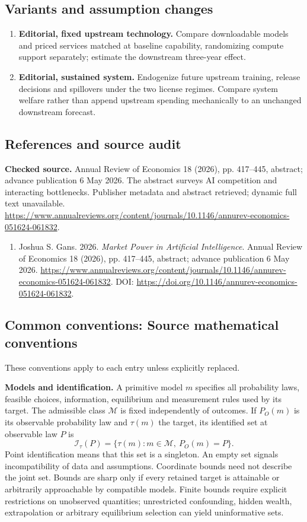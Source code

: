 \documentclass[11pt,a4paper]{article}
\begin{document}
\subsection*{Variants and assumption changes}
\begin{enumerate}
\item \textbf{Editorial, fixed upstream technology.} Compare downloadable models and priced services matched at baseline capability, randomizing compute support separately; estimate the downstream three-year effect.
\item \textbf{Editorial, sustained system.} Endogenize future upstream training, release decisions and spillovers under the two license regimes. Compare system welfare rather than append upstream spending mechanically to an unchanged downstream forecast.
\end{enumerate}
\subsection*{References and source audit}
\textbf{Checked source.} Annual Review of Economics 18 (2026), pp. 417--445, abstract; advance publication 6 May 2026. The abstract surveys AI competition and interacting bottlenecks. Publisher metadata and abstract retrieved; dynamic full text unavailable. \url{https://www.annualreviews.org/content/journals/10.1146/annurev-economics-051624-061832}.
\begin{enumerate}\raggedright
\item\hypertarget{definitions:source:30007699:1}{} Joshua S. Gans. 2026. \emph{Market Power in Artificial Intelligence}. Annual Review of Economics 18 (2026), pp. 417--445, abstract; advance publication 6 May 2026.
\url{https://www.annualreviews.org/content/journals/10.1146/annurev-economics-051624-061832}.
DOI: \url{https://doi.org/10.1146/annurev-economics-051624-061832}.
\end{enumerate}

\subsection*{Common conventions: Source mathematical conventions}

These conventions apply to each entry unless explicitly replaced.

\textbf{Models and identification.} A primitive model \(m\) specifies all probability laws, feasible choices, information, equilibrium and measurement rules used by its target. The admissible class \(\mathcal M\) is fixed independently of outcomes. If \(P_O(m)\) is its observable probability law and \(\tau(m)\) the target, its identified set at observable law \(P\) is
\[
 \mathcal I_\tau(P)=\{\tau(m):m\in\mathcal M,\ P_O(m)=P\}.
\]
Point identification means that this set is a singleton. An empty set signals incompatibility of data and assumptions. Coordinate bounds need not describe the joint set. Bounds are sharp only if every retained target is attainable or arbitrarily approachable by compatible models. Finite bounds require explicit restrictions on unobserved quantities; unrestricted confounding, hidden wealth, extrapolation or arbitrary equilibrium selection can yield uninformative sets.
\end{document}
